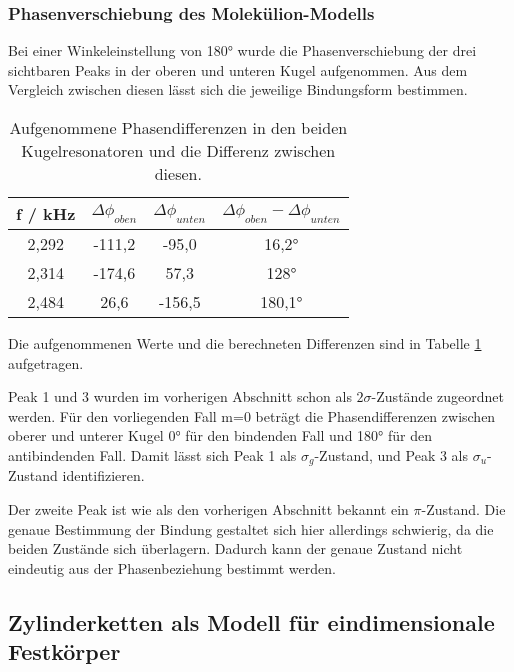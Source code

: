 \subsubsection{Phasenverschiebung des Molekülion-Modells}

Bei einer Winkeleinstellung von 180° wurde die Phasenverschiebung der drei sichtbaren Peaks in der oberen und unteren Kugel aufgenommen. Aus dem Vergleich zwischen diesen lässt sich die jeweilige Bindungsform bestimmen. 
\begin{table}[H]
  \centering
\begin{tabular}{c|c|c|c}
  f / kHz & $\Delta\phi_{oben}$ & $\Delta\phi_{unten}$ &  $\Delta\phi_{oben}-\Delta\phi_{unten}$ \\ \hline
  2,292 & -111,2 & -95,0 & 16,2° \\
  2,314 & -174,6 & 57,3 & 128° \\
  2,484 & 26,6 & -156,5 &  180,1° \\
\end{tabular}
\caption{Aufgenommene Phasendifferenzen in den beiden Kugelresonatoren und die Differenz zwischen diesen.} 
\label{tab:phasen}
\end{table}
Die aufgenommenen Werte und die berechneten Differenzen sind in Tabelle \ref{tab:phasen} aufgetragen.

Peak 1 und 3 wurden im vorherigen Abschnitt schon als $2\sigma$-Zustände zugeordnet werden.
Für den vorliegenden Fall m=0 beträgt die Phasendifferenzen zwischen oberer und unterer Kugel 0° für den bindenden Fall und 180° für den antibindenden Fall. Damit lässt sich Peak 1 als $\sigma_g$-Zustand, und Peak 3 als $\sigma_u$-Zustand identifizieren.

Der zweite Peak ist wie als den vorherigen Abschnitt bekannt ein $\pi$-Zustand. Die genaue Bestimmung der Bindung gestaltet sich hier allerdings schwierig, da die beiden Zustände sich überlagern. Dadurch kann der genaue Zustand nicht eindeutig aus der Phasenbeziehung bestimmt werden.


\subsection{Zylinderketten als Modell für eindimensionale Festkörper}
